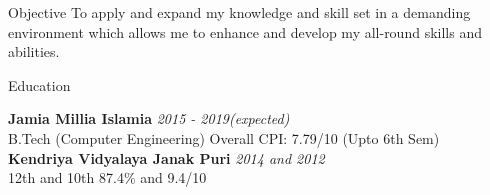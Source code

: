 \documentclass{resume} %
\begin{document}
	\centering


\begin{rSection}{Objective}
To apply and expand my knowledge and skill set in a demanding environment which allows me to enhance and develop my all-round skills and abilities.
\end{rSection}


\begin{rSection}{Education}

{\bf Jamia Millia Islamia} \hfill {\em 2015 - 2019(expected)} 
\\ B.Tech (Computer Engineering) \hfill { Overall CPI: 7.79/10 (Upto 6th Sem)} 
\\{\bf Kendriya Vidyalaya Janak Puri} \hfill {\em 2014 and 2012} \\
12th and 10th \hfill {87.4\% and 9.4/10}


\end{rSection}
\end{document}
